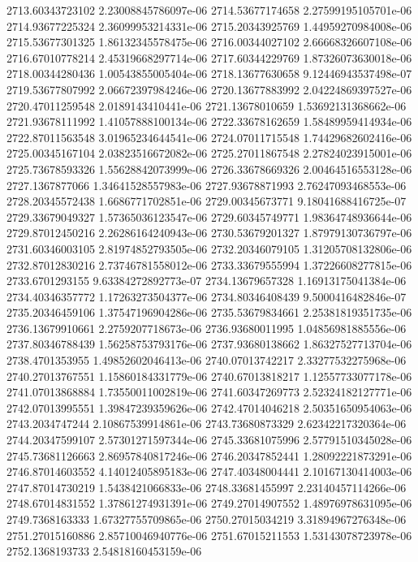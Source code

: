{2713.60343723102 2.23008845786097e-06
2714.53677174658 2.27599195105701e-06
2714.93677225324 2.36099953214331e-06
2715.20343925769 1.44959270984008e-06
2715.53677301325 1.86132345578475e-06
2716.00344027102 2.66668326607108e-06
2716.67010778214 2.45319668297714e-06
2717.60344229769 1.87326073630018e-06
2718.00344280436 1.00543855005404e-06
2718.13677630658 9.12446943537498e-07
2719.53677807992 2.06672397984246e-06
2720.13677883992 2.04224869397527e-06
2720.47011259548 2.0189143410441e-06
2721.13678010659 1.53692131368662e-06
2721.93678111992 1.41057888100134e-06
2722.33678162659 1.58489959414934e-06
2722.87011563548 3.01965234644541e-06
2724.07011715548 1.74429682602416e-06
2725.00345167104 2.03823516672082e-06
2725.27011867548 2.27824023915001e-06
2725.73678593326 1.55628842073999e-06
2726.33678669326 2.00464516553128e-06
2727.1367877066 1.34641528557983e-06
2727.93678871993 2.76247093468553e-06
2728.20345572438 1.6686771702851e-06
2729.00345673771 9.18041688416725e-07
2729.33679049327 1.57365036123547e-06
2729.60345749771 1.98364748936644e-06
2729.87012450216 2.26286164240943e-06
2730.53679201327 1.87979130736797e-06
2731.60346003105 2.81974852793505e-06
2732.20346079105 1.31205708132806e-06
2732.87012830216 2.73746781558012e-06
2733.33679555994 1.37226608277815e-06
2733.6701293155 9.63384272892773e-07
2734.13679657328 1.16913175041384e-06
2734.40346357772 1.17263273504377e-06
2734.80346408439 9.5000416482846e-07
2735.20346459106 1.37547196904286e-06
2735.53679834661 2.25381819351735e-06
2736.13679910661 2.2759207718673e-06
2736.93680011995 1.04856981885556e-06
2737.80346788439 1.56258753793176e-06
2737.93680138662 1.86327527713704e-06
2738.4701353955 1.49852602046413e-06
2740.07013742217 2.33277532275968e-06
2740.27013767551 1.15860184331779e-06
2740.67013818217 1.12557733077178e-06
2741.07013868884 1.73550011002819e-06
2741.60347269773 2.52324182127771e-06
2742.07013995551 1.39847239359626e-06
2742.47014046218 2.50351650954063e-06
2743.2034747244 2.10867539914861e-06
2743.73680873329 2.62342217320364e-06
2744.20347599107 2.57301271597344e-06
2745.33681075996 2.57791510345028e-06
2745.73681126663 2.86957840817246e-06
2746.20347852441 1.28092221873291e-06
2746.87014603552 4.14012405895183e-06
2747.40348004441 2.10167130414003e-06
2747.87014730219 1.5438421066833e-06
2748.33681455997 2.23140457114266e-06
2748.67014831552 1.37861274931391e-06
2749.27014907552 1.48976978631095e-06
2749.7368163333 1.67327755709865e-06
2750.27015034219 3.31894967276348e-06
2751.27015160886 2.85710046940776e-06
2751.67015211553 1.53143078723978e-06
2752.1368193733 2.54818160453159e-06
}
